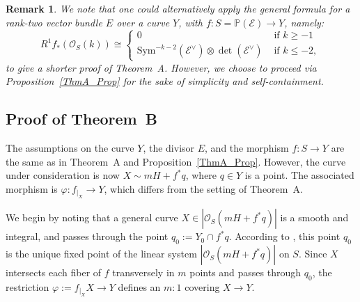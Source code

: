 \documentclass[a4paper,12pt]{amsart}
\newtheorem{remark}[thm]{Remark}
\begin{document}
\begin{remark}
We note that one could alternatively apply the general formula for a rank-two vector bundle $E$ over a curve $Y$, with $f : S = \mathbb{P} (\mathcal{E}) \to Y$, namely:
\[
 R^1 f_*(\mathcal{O}_S(k)) \cong
 \begin{cases}
  0     & \mbox{ if } k \geq -1 \\
  \mathrm{Sym}^{-k - 2}(\mathcal{E}^\vee) \otimes \det(\mathcal{E}^\vee) & \mbox{ if } k \leq -2 ,
 \end{cases}
\]
to give a shorter proof of \textnormal{Theorem~A}. However, we choose to proceed via \textnormal{Proposition~\ref{ThmA_Prop}} for the sake of simplicity and self-containment.
\end{remark}


\subsection{Proof of Theorem~B}\label{Sec2.3}

The assumptions on the curve $Y$, the divisor $E$, and the morphism $f : S \to Y$ are the same as in \textnormal{Theorem~A} and \textnormal{Proposition~\ref{ThmA_Prop}}. However, the curve under consideration is now $X \sim mH + f^{\ast} q$, where $q \in Y$ is a point. The associated morphism is $\varphi : f_{|_X} \to Y$, which differs from the setting of \textnormal{Theorem~A}.

We begin by noting that a general curve $X \in |\mathcal{O}_S (mH + f^{\ast} q)|$ is a smooth and integral, and passes through the point $q_0 := Y_0 \cap f^{\ast} q$. According to \cite[Prop.~36]{GP2005}, this point $q_0$ is the unique fixed point of the linear system $|\mathcal{O}_S (mH + f^{\ast} q)|$ on $S$. Since $X$ intersects each fiber of $f$ transversely in $m$ points and passes through $q_0$, the restriction $\varphi := f_{|_X} X \to Y$ defines an $m:1$ covering $X \to Y$.
\end{document}
